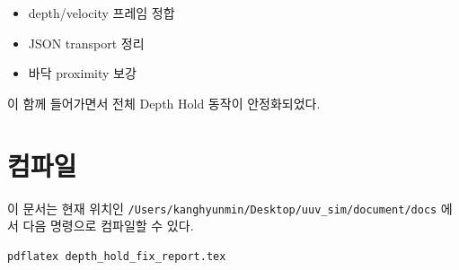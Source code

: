 \documentclass[11pt]{article}
\begin{document}
\begin{itemize}[leftmargin=1.5em]
\item depth/velocity 프레임 정합
\item JSON transport 정리
\item 바닥 proximity 보강
\end{itemize}

이 함께 들어가면서 전체 Depth Hold 동작이 안정화되었다.

\section{컴파일}

이 문서는 현재 위치인 \texttt{/Users/kanghyunmin/Desktop/uuv\_sim/document/docs}
에서 다음 명령으로 컴파일할 수 있다.

\begin{verbatim}
pdflatex depth_hold_fix_report.tex
\end{verbatim}
\end{document}

